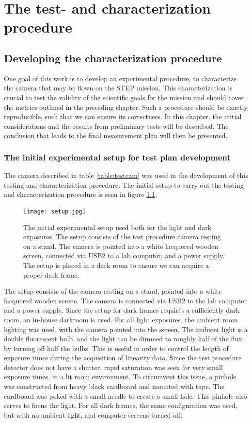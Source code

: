 \documentclass[../main.tex]{subfiles}
\begin{document}
	
	\chapter{The test- and characterization procedure}
		\section{Developing the characterization procedure}
		One goal of this work is to develop an experimental procedure, to characterize the camera that may be flown on the STEP mission. This characterization is crucial to test the validity of the scientific goals for the mission and should cover the metrics outlined in the preceding chapter. Such a procedure should be exactly reproducible, such that we can ensure its correctness. In this chapter, the initial considerations and the results from preliminary tests will be described. The conclusion that leads to the final measurement plan will then be presented.
		
		\subsection{The initial experimental setup for test plan development}
		The camera described in table \ref{table:testcam} was used in the development of this testing and characterization procedure. The initial setup to carry out the testing and characterization procedure is seen in figure \ref{fig:setup}. 
		
		\begin{figure}
			\centering
			\texttt{[image: setup.jpg]}
			\caption{The initial experimental setup used both for the light and dark exposures. The setup consists of the test procedure camera resting on a stand. The camera is pointed into a white lacquered wooden screen, connected via USB2 to a lab computer, and a power supply. The setup is placed in a dark room to ensure we can acquire a proper dark frame.}
			\label{fig:setup}
		\end{figure}
		
		The setup consists of the camera resting on a stand, pointed into a white lacquered wooden screen. The camera is connected via USB2 to the lab computer and a power supply. Since the setup for dark frames requires a sufficiently dark room, an in-house darkroom is used.
		For all light exposures, the ambient room lighting was used, with the camera pointed into the screen. The ambient light is a double fluorescent bulb, and the light can be dimmed to roughly half of the flux by turning off half the bulbs. This is useful in order to control the length of exposure times during the acquisition of linearity data. Since the test procedure detector does not have a shutter, rapid saturation was seen for very small exposure times, in a lit room environment. To circumvent this issue, a pinhole was constructed from heavy black cardboard and mounted with tape. The cardboard was poked with a small needle to create a small hole. This pinhole also serves to focus the light.
		For all dark frames, the same configuration was used, but with no ambient light, and computer screens turned off. 
		
\end{document}
